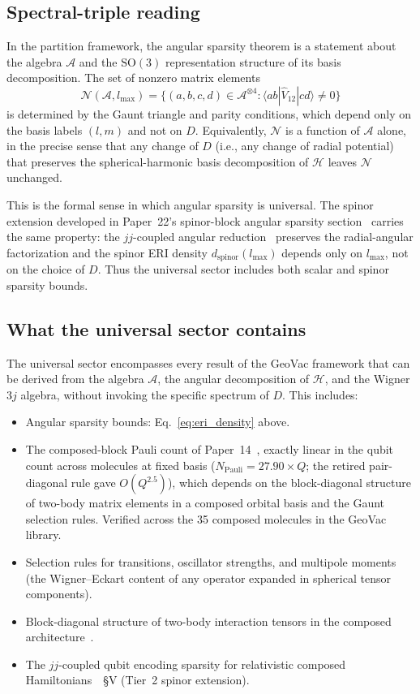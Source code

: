 \documentclass[twocolumn,pra,amsmath,amssymb,superscriptaddress]{revtex4-2}
\begin{document}
\subsection{Spectral-triple reading}

In the partition framework, the angular sparsity theorem is a
statement about the algebra $\mathcal{A}$ and the $\mathrm{SO}(3)$
representation structure of its basis decomposition.  The set of
nonzero matrix elements
\[
  \mathcal{N}(\mathcal{A}, l_{\max})
  = \{(a, b, c, d) \in \mathcal{A}^{\otimes 4} :
     \langle a b | \hat{V}_{12} | c d \rangle \ne 0\}
\]
is determined by the Gaunt triangle and parity conditions, which
depend only on the basis labels $(l, m)$ and not on $D$.  Equivalently,
$\mathcal{N}$ is a function of $\mathcal{A}$ alone, in the precise
sense that any change of $D$ (i.e., any change of radial potential)
that preserves the spherical-harmonic basis decomposition of
$\mathcal{H}$ leaves $\mathcal{N}$ unchanged.

This is the formal sense in which angular sparsity is universal.  The
spinor extension developed in Paper~22's spinor-block angular sparsity
section~\cite{paper22} carries the same property: the $jj$-coupled angular reduction~\cite{Dyall} preserves
the radial-angular factorization and the spinor ERI density
$d_{\mathrm{spinor}}(l_{\max})$ depends only on $l_{\max}$, not on the
choice of $D$.  Thus the universal sector includes both scalar and
spinor sparsity bounds.

\subsection{What the universal sector contains}

The universal sector encompasses every result of the GeoVac framework
that can be derived from the algebra $\mathcal{A}$, the angular
decomposition of $\mathcal{H}$, and the Wigner $3j$ algebra,
without invoking the specific spectrum of $D$.  This includes:

\begin{itemize}
\item Angular sparsity bounds: Eq.~\eqref{eq:eri_density} above.
\item The composed-block Pauli count of Paper~14~\cite{paper14},
  exactly linear in the qubit count across molecules at fixed basis
  ($N_{\mathrm{Pauli}} = 27.90 \times Q$; the retired pair-diagonal
  rule gave $O(Q^{2.5})$), which depends on the block-diagonal
  structure of two-body matrix elements in a composed orbital basis
  and the Gaunt selection rules.  Verified across the 35 composed
  molecules in the GeoVac library.
\item Selection rules for transitions, oscillator strengths, and
  multipole moments (the Wigner--Eckart content of any operator
  expanded in spherical tensor components).
\item Block-diagonal structure of two-body interaction tensors in
  the composed architecture~\cite{paper17}.
\item The $jj$-coupled qubit encoding sparsity for relativistic
  composed Hamiltonians~\cite{paper14}~\S V (Tier~2 spinor
  extension).
\end{itemize}
\end{document}
